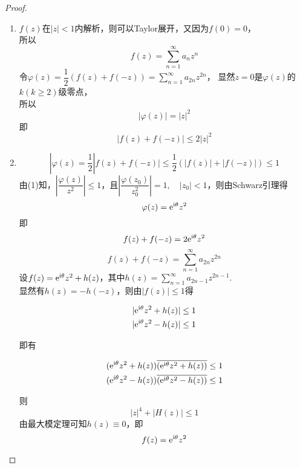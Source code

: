 \begin{proof}
    
    \begin{enumerate}
        
        \item
            $f(z)$在$|z| < 1$内解析，则可以\textup{Taylor}展开，又因为$f(0) = 0$，\\
            所以
            \[ f(z) = \sum\limits_{n = 1}^{\infty}{a_nz^n}\]
            令$\varphi(z) = \dfrac{1}{2} (f(z) + f(-z)) = \sum\limits_{n = 1}^{\infty}{a_{2n}z^{2n}}$，
            显然$z = 0$是$\varphi(z)$的$k(k \geq 2)$级零点，\\
            所以
            \[|\varphi(z)| = |z|^2\]
            即
            \[|f(z) + f(-z)| \leq 2|z|^2\]

        \item 
            \[|\varphi(z) = \dfrac{1}{2} |f(z) + f(-z)| \leq \dfrac{1}{2} (|f(z)| + |f(-z)|) \leq 1\]
            由\textup{(1)}知，$\left| \dfrac{\varphi(z)}{z^2} \right| \leq 1$，且$\left| \dfrac{\varphi(z_0)}{z_0^2} \right| = 1, \quad |z_0| < 1$，则由\textup{Schwarz}引理得
            \[\varphi(z) = \mathrm{e}^{\mathrm{i}\theta} z^2\]
            即
            \[f(z) + f(-z) = 2\mathrm{e}^{\mathrm{i}\theta} z^2\]
            \[f(z) + f(-z) = \sum\limits_{n = 1}^{\infty}{a_{2n}z^{2n}}\]
            设$f(z) = \mathrm{e}^{\mathrm{i}\theta} z^2 + h(z)$，其中$h(z) = \sum\limits_{n = 1}^{\infty}{a_{2n - 1}z^{2n - 1}}$. \\
            显然有$h(z) = -h(-z)$，则由$|f(z)| \leq 1$得

            \begin{align*}
                &|\mathrm{e}^{\mathrm{i}\theta} z^2 + h(z)| \leq 1 \\
                &|\mathrm{e}^{\mathrm{i}\theta} z^2 - h(z)| \leq 1
            \end{align*}

            即有

            \begin{align*}
                &(\mathrm{e}^{\mathrm{i}\theta} z^2 + h(z)) \overline{(\mathrm{e}^{\mathrm{i}\theta} z^2 + h(z))} \leq 1 \\
                &(\mathrm{e}^{\mathrm{i}\theta} z^2 - h(z)) \overline{(\mathrm{e}^{\mathrm{i}\theta} z^2 - h(z))} \leq 1
            \end{align*}

            则
            \[|z|^4 + |H(z)| \leq 1 \]
            由最大模定理可知$h(z)\equiv0$，即
            \[f(z) = \mathrm{e}^{\mathrm{i}\theta} z^2 \]

    \end{enumerate}

\end{proof}

